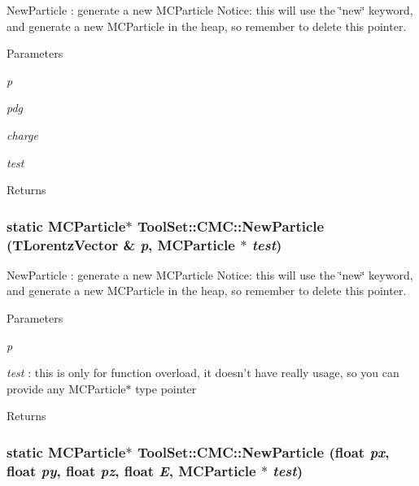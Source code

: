 NewParticle : generate a new MCParticle Notice: this will use the \char`\"{}new\char`\"{} keyword, and generate a new MCParticle in the heap, so remember to delete this pointer. 
\begin{DoxyParams}{Parameters}
\item[{\em p}]\item[{\em pdg}]\item[{\em charge}]\item[{\em test}]\end{DoxyParams}
\begin{DoxyReturn}{Returns}

\end{DoxyReturn}
\hypertarget{classToolSet_1_1CMC_a5bd1a7515135570ef348bd77d1d26933}{
\subsubsection[{NewParticle}]{\setlength{\rightskip}{0pt plus 5cm}static MCParticle$\ast$ ToolSet::CMC::NewParticle (TLorentzVector \& {\em p}, \/  MCParticle $\ast$ {\em test})}}
\label{classToolSet_1_1CMC_a5bd1a7515135570ef348bd77d1d26933}


NewParticle : generate a new MCParticle Notice: this will use the \char`\"{}new\char`\"{} keyword, and generate a new MCParticle in the heap, so remember to delete this pointer. 
\begin{DoxyParams}{Parameters}
\item[{\em p}]\item[{\em test}]: this is only for function overload, it doesn't have really usage, so you can provide any MCParticle$\ast$ type pointer\end{DoxyParams}
\begin{DoxyReturn}{Returns}

\end{DoxyReturn}
\hypertarget{classToolSet_1_1CMC_ab30c29f999f2b3dd1c85ed68636f2281}{
\subsubsection[{NewParticle}]{\setlength{\rightskip}{0pt plus 5cm}static MCParticle$\ast$ ToolSet::CMC::NewParticle (float {\em px}, \/  float {\em py}, \/  float {\em pz}, \/  float {\em E}, \/  MCParticle $\ast$ {\em test})}}
\label{classToolSet_1_1CMC_ab30c29f999f2b3dd1c85ed68636f2281}


